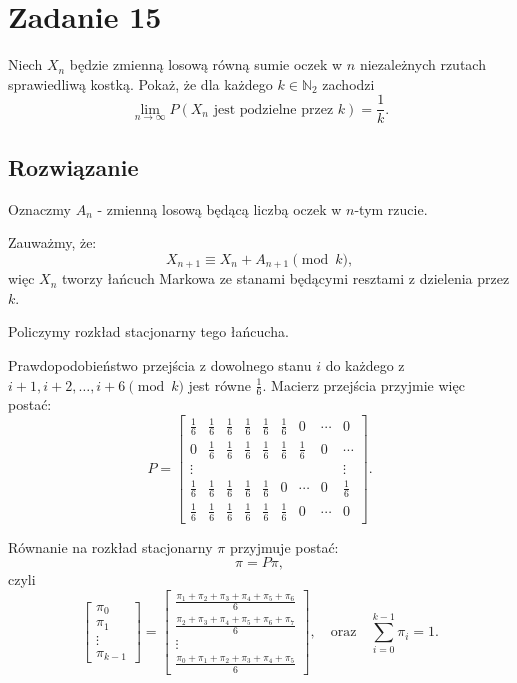 \section{Zadanie 15}
Niech \(X_n\) będzie zmienną losową równą sumie oczek w \(n\) niezależnych rzutach sprawiedliwą kostką. Pokaż, że dla każdego \(k \in \mathbb{N}_2\) zachodzi
\[
	\lim_{n \to \infty} P(X_n \text{ jest podzielne przez } k) = \frac{1}{k}.
\]

\subsection*{Rozwiązanie}

Oznaczmy \(A_n\) - zmienną losową będącą liczbą oczek w \(n\)-tym rzucie.

Zauważmy, że:
\[
	X_{n+1} \equiv X_n + A_{n+1} \pmod{k},
\]
więc \(X_n\) tworzy łańcuch Markowa ze stanami będącymi resztami z dzielenia przez \(k\).

Policzymy rozkład stacjonarny tego łańcucha.

Prawdopodobieństwo przejścia z dowolnego stanu \(i\) do każdego z \(i+1, i+2, \dots, i+6 \pmod{k}\) jest równe \(\frac{1}{6}\). Macierz przejścia przyjmie więc postać:
\[
	P =
	\begin{bmatrix}
		\frac{1}{6} & \frac{1}{6} & \frac{1}{6} & \frac{1}{6} & \frac{1}{6} & \frac{1}{6} & 0           & \cdots & 0           \\[2ex]
		0           & \frac{1}{6} & \frac{1}{6} & \frac{1}{6} & \frac{1}{6} & \frac{1}{6} & \frac{1}{6} & 0      & \cdots      \\[2ex]
		\vdots      &             &             &             &             &             &             &        & \vdots      \\[2ex]
		\frac{1}{6} & \frac{1}{6} & \frac{1}{6} & \frac{1}{6} & \frac{1}{6} & 0           & \cdots      & 0      & \frac{1}{6} \\[2ex]
		\frac{1}{6} & \frac{1}{6} & \frac{1}{6} & \frac{1}{6} & \frac{1}{6} & \frac{1}{6} & 0           & \cdots & 0
	\end{bmatrix}.
\]

Równanie na rozkład stacjonarny \(\pi\) przyjmuje postać:
\[
	\pi = P \pi,
\]
czyli
\[
	\begin{bmatrix}
		\pi_0  \\[1.5ex]
		\pi_1  \\[1.5ex]
		\vdots \\[1.5ex]
		\pi_{k-1}
	\end{bmatrix}
	=
	\begin{bmatrix}
		\frac{\pi_1+\pi_2+\pi_3+\pi_4+\pi_5+\pi_6}{6} \\[1.5ex]
		\frac{\pi_2+\pi_3+\pi_4+\pi_5+\pi_6+\pi_7}{6} \\[1.5ex]
		\vdots                                        \\[1.5ex]
		\frac{\pi_0+\pi_1+\pi_2+\pi_3+\pi_4+\pi_5}{6}
	\end{bmatrix},
	\quad
	\text{oraz} \quad
	\sum_{i=0}^{k-1} \pi_i = 1.
\]

